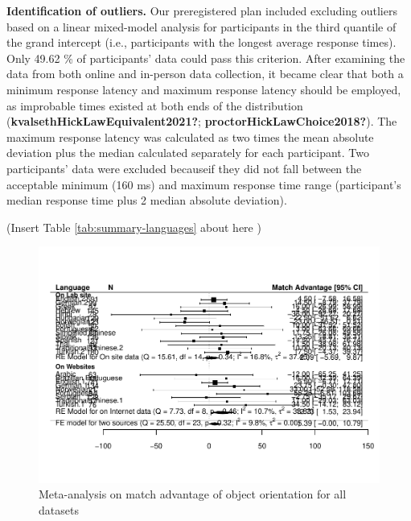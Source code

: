 \documentclass[
  man,floatsintext]{apa6}
\begin{document}
\textbf{Identification of outliers.} Our preregistered plan included excluding outliers based on a linear mixed-model analysis for participants in the third quantile of the grand intercept (i.e., participants with the longest average response times). Only 49.62 \% of participants' data could pass this criterion. After examining the data from both online and in-person data collection, it became clear that both a minimum response latency and maximum response latency should be employed, as improbable times existed at both ends of the distribution (\textbf{kvalsethHickLawEquivalent2021?}; \textbf{proctorHickLawChoice2018?}). The maximum response latency was calculated as two times the mean absolute deviation plus the median calculated separately for each participant. Two participants' data were excluded becauseif they did not fall between the acceptable minimum (160 ms) and maximum response time range (participant's median response time plus 2 median absolute deviation).

(Insert Table \ref{tab:summary-languages} about here )

\begin{figure}
\centering
\includegraphics{Stage2_Report_0930_files/figure-latex/meta-sources-1.pdf}
\caption{\label{fig:meta-sources}Meta-analysis on match advantage of object orientation for all datasets}
\end{figure}
\end{document}
